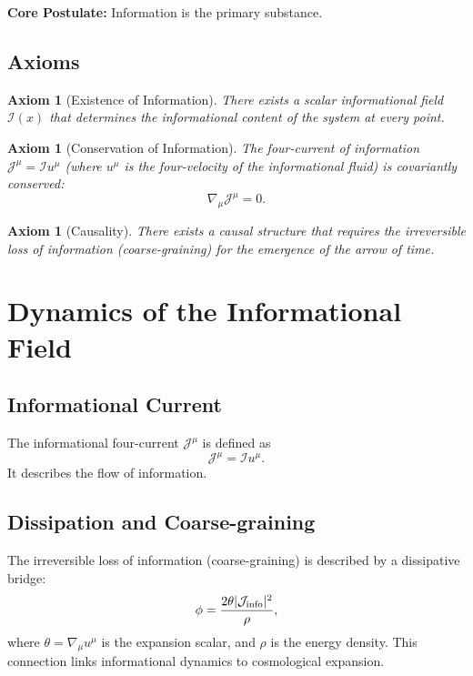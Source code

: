 \documentclass[12pt,a4paper]{book}
\newtheorem{axiom}[theorem]{Axiom}
\newcommand{\J}{\mathcal{J}}
\newcommand{\I}{\mathcal{I}}
\newcommand{\info}{{\rm info}}
\begin{document}
\textbf{Core Postulate:} Information is the primary substance. \cite{wheeler1990information}

\section{Axioms}

\begin{axiom}[Existence of Information]
There exists a scalar informational field $\I(x)$ that determines the informational content of the system at every point.
\end{axiom}

\begin{axiom}[Conservation of Information]
The four-current of information $\J^\mu = \I u^\mu$ (where $u^\mu$ is the four-velocity of the informational fluid) is covariantly conserved:
\begin{equation}
    \nabla_\mu \J^\mu = 0.
\end{equation}
\end{axiom}

\begin{axiom}[Causality]
There exists a causal structure that requires the irreversible loss of information (coarse-graining) for the emergence of the arrow of time.
\end{axiom}

\chapter{Dynamics of the Informational Field}

\section{Informational Current}

The informational four-current $\J^\mu$ is defined as
\begin{equation}
    \J^\mu = \I u^\mu.
\end{equation}
It describes the flow of information.

\section{Dissipation and Coarse-graining}

The irreversible loss of information (coarse-graining) is described by a dissipative bridge:
\begin{equation}
    \phi = \frac{2\theta |\J_{\info}|^2}{\rho},
\end{equation}
where $\theta = \nabla_\mu u^\mu$ is the expansion scalar, and $\rho$ is the energy density. This connection links informational dynamics to cosmological expansion.
\end{document}
